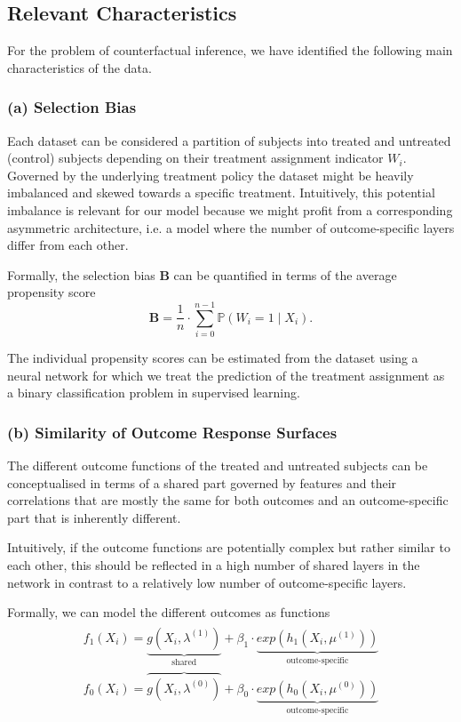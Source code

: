 \subsection{Relevant Characteristics} \label{sec:relevant-characteristics}
For the problem of counterfactual inference, we have identified the following main characteristics of the data. 

\subsubsection{(a) Selection Bias}
Each dataset can be considered a partition  of subjects into treated and untreated (control) subjects depending on their treatment assignment indicator $W_i$. Governed by the underlying treatment policy the dataset might be heavily imbalanced and skewed towards a specific treatment. 
Intuitively, this potential imbalance is relevant for our model because we might profit from a corresponding asymmetric architecture, i.e. a model where the number of outcome-specific layers differ from each other. 

Formally, the selection bias $\mathbf{B}$ can be quantified in terms of the average propensity score 
$$
\mathbf{B} = \frac{1}{n} \cdot \sum \limits_{{i=0}}^{n-1}  \mathbb{P}(W_i = 1 \mid X_i).
$$

The individual propensity scores can be estimated from the dataset using a neural network for which we treat the prediction of the treatment assignment as a binary classification problem in supervised learning. 



\subsubsection{(b) Similarity of  Outcome Response Surfaces}
The different outcome functions of the treated and untreated subjects can be conceptualised in terms of a shared part governed by features and their correlations that are mostly the same for both outcomes and an outcome-specific part that is inherently different. 

Intuitively, if the outcome functions are potentially complex but rather similar to each other, this should be reflected in a high number of shared layers in the network in contrast to a relatively low number of outcome-specific layers. 

Formally, we can model the different outcomes as functions
\begin{align}
\label{eqn:outcome-functions}
\begin{split}
f_1(X_i) =  \underbrace{g(X_i, \lambda^{(1)})}_{\text{shared}} +   \beta_1 \cdot \underbrace{ exp(h_1(X_i, \mu^{(1)}))}_{\text{outcome-specific}}
\\
f_0(X_i) = \overbrace{g(X_i, \lambda^{(0)})} +  \beta_0 \cdot \underbrace{exp(h_0(X_i, \mu^{(0)}))}_{\text{outcome-specific}}
\end{split}
\end{align}


